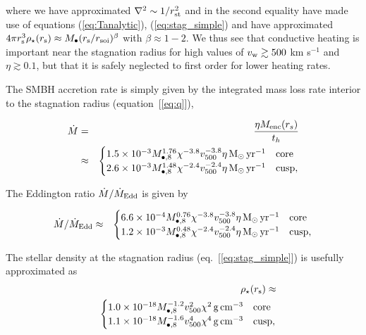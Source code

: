 \documentclass[usenatbib,fleqn]{mn2e}
\newcommand{\eddr}{\dot{M}/\dot{M}_{\rm Edd}}
\newcommand{\rs}{r_s}
\newcommand{\Menc}{M_{\rm enc}}
\newcommand{\Mbheight}{M_{\bullet,8}}
\newcommand{\pyear}{{\rm yr}^{-1}}
\renewcommand{\th}{t_h}
\begin{document}
where we have approximated $\nabla^{2} \sim 1/r_{\rm st}^{2}$ and in the second equality have made use of equations (\ref{eq:Tanalytic}), (\ref{eq:stag_simple}) and have approximated $4\pi r_{\rm s}^{3}\rho_{\star}(r_{\rm s}) \approx M_{\bullet}(r_{\rm s}/r_{\rm soi})^{\beta}$ with $\beta \approx 1-2$.  We thus see that conductive heating is important near the stagnation radius for high values of $v_{\rm w} \gtrsim 500$ km s$^{-1}$ and $\eta \gtrsim 0.1$, but that it is safely neglected to first order for lower heating rates.

The SMBH accretion rate is simply given by the integrated mass loss
rate interior to the stagnation radius (equation~[\ref{eq:q}]), 

\begin{eqnarray}
  \dot{M} &=& \frac{\eta \Menc(\rs)}{\th} \nonumber \\
&\approx&
  \begin{cases}
    1.5 \times 10^{-3} M_{\bullet,8}^{1.76}
    \chi^{-3.8} v_{500}^{-3.8}  \eta \Msun \, \pyear& \text{core} \\
    2.6 \times 10^{-3} \Mbheight^{1.48} 
    \chi^{-2.4} v_{500}^{-2.4}  \eta \Msun \, \pyear  & \text{cusp}, 
  \end{cases}
  \label{eq:mdot_analytic}
\end{eqnarray}

The Eddington ratio $\eddr$ is given by 

\begin{eqnarray}
\eddr&\approx&
  \begin{cases}
    6.6 \times 10^{-4} M_{\bullet,8}^{0.76}
    \chi^{-3.8} v_{500}^{-3.8}  \eta \Msun \, \pyear& \text{core} \\
    1.2 \times 10^{-3} \Mbheight^{0.48} 
    \chi^{-2.4} v_{500}^{-2.4}  \eta \Msun \, \pyear  & \text{cusp}, 
  \end{cases}
  \label{eq:eddr_analytic}
\end{eqnarray}

The stellar density at the stagnation radius (eq.~[\ref{eq:stag_simple}]) is usefully approximated as
\begin{eqnarray}
  && \rho_{\star}(r_{\rm s}) \approx \nonumber \\
&& \begin{cases}
    1.0\times 10^{-18}M_{\bullet,8}^{-1.2}v_{500}^{2}\chi^{2}\,{\rm g\,cm^{-3}}
& \text{core} \\
    1.1 \times 10^{-18} M_{\bullet,8}^{-1.6}v_{500}^{4}\chi^{4}
      \,{\rm g\,cm^{-3}}  & \text{cusp}, 
  \end{cases}
  \label{eq:rhostarrs}
\end{eqnarray}
\end{document}
